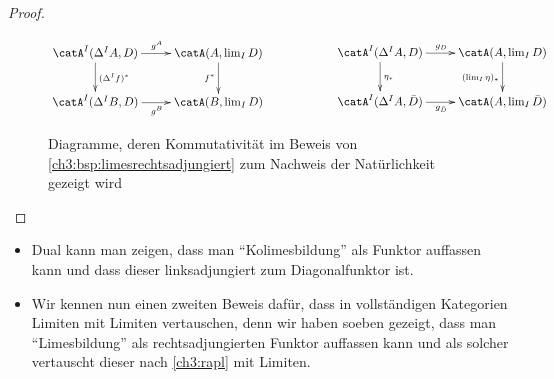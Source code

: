 \begin{proof}
\begin{figure}
        \begin{equation*}
            \begin{gathered}
                \xymatrix{
                    \catA^I(\Delta^I A, D) \ar[r]^{g^A} \ar[d]^{(\Delta^I f)^*} &
                    \catA(A, \lim_I D) \ar[d]_{f^*}
                    \\
                    \catA^I(\Delta^I B, D) \ar[r]_{g^B} & \catA(B, \lim_I D)
                }
            \end{gathered}
            \hspace{2cm}
            \begin{gathered}
                \xymatrix{
                    \catA^I(\Delta^I A, D) \ar[r]^{g_D} \ar[d]^{\eta_\ast} &
                    \catA(A, \lim_I D) \ar[d]_{(\lim_I\eta)_\ast}
                    \\
                    \catA^I(\Delta^I A, \bar D) \ar[r]_{g_{\bar D}} &
                    \catA(A, \lim_I\bar D)
                }
            \end{gathered}
        \end{equation*}
        \caption{Diagramme, deren Kommutativität im Beweis von
            \cref{ch3:bsp:limesrechtsadjungiert} zum Nachweis der Natürlichkeit
            gezeigt wird}
        \label{ch3:fig:limrechtsadjdiagramme}
    \end{figure}
\end{proof}

\begin{thBemerkung}\hfill
    \begin{itemize}
        \item
            Dual kann man zeigen, dass man \enquote{Kolimesbildung}
            als Funktor auffassen kann und dass dieser linksadjungiert
            zum Diagonalfunktor ist.
            
        \item
            Wir kennen nun einen zweiten Beweis dafür, dass in vollständigen
            Kategorien Limiten mit Limiten vertauschen, denn wir haben soeben
            gezeigt, dass man \enquote{Limesbildung} als rechtsadjungierten
            Funktor auffassen kann und als solcher vertauscht dieser nach
            \cref{ch3:rapl} mit Limiten.
    \end{itemize}
\end{thBemerkung}
